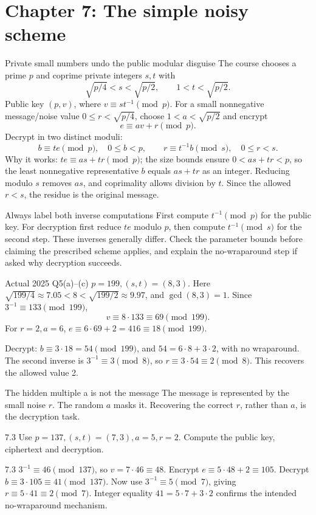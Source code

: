 \documentclass[11pt,a4paper]{article}
\begin{document}
\section{Chapter 7: The simple noisy scheme}
\begin{concept}{Private small numbers undo the public modular disguise}
The course chooses a prime \(p\) and coprime private integers \(s,t\) with
\[\sqrt{p/4}<s<\sqrt{p/2},\qquad1<t<\sqrt{p/2}.\]
Public key \((p,v)\), where \(v\equiv st^{-1}\pmod p\). For a small nonnegative message/noise value \(0\le r<\sqrt{p/4}\), choose \(1<a<\sqrt{p/2}\) and encrypt
\[e\equiv av+r\pmod p.\]
Decrypt in two distinct moduli:
\[b\equiv te\pmod p,\quad0\le b<p,\qquad r\equiv t^{-1}b\pmod s,\quad0\le r<s.\]
Why it works: \(te\equiv as+tr\pmod p\); the size bounds ensure \(0<as+tr<p\), so the least nonnegative representative \(b\) equals \(as+tr\) as an integer. Reducing modulo \(s\) removes \(as\), and coprimality allows division by \(t\). Since the allowed \(r<s\), the residue is the original message.
\end{concept}
\begin{method}{Always label both inverse computations}
First compute \(t^{-1}\pmod p\) for the public key. For decryption first reduce \(te\) modulo \(p\), then compute \(t^{-1}\pmod s\) for the second step. These inverses generally differ. Check the parameter bounds before claiming the prescribed scheme applies, and explain the no-wraparound step if asked why decryption succeeds.
\end{method}
\begin{example}{Actual 2025 Q5(a)--(c)}
\(p=199,(s,t)=(8,3)\). Here \(\sqrt{199/4}\approx7.05<8<\sqrt{199/2}\approx9.97\), and \(\gcd(8,3)=1\). Since \(3^{-1}\equiv133\pmod{199}\),
\[v\equiv8\cdot133\equiv69\pmod{199}.\]
For \(r=2,a=6\), \(e\equiv6\cdot69+2=416\equiv18\pmod{199}\).

Decrypt: \(b\equiv3\cdot18=54\pmod{199}\), and \(54=6\cdot8+3\cdot2\), with no wraparound. The second inverse is \(3^{-1}\equiv3\pmod8\), so \(r\equiv3\cdot54\equiv2\pmod8\). This recovers the allowed value 2.
\end{example}
\begin{tip}{The hidden multiple a is not the message}
The message is represented by the small noise \(r\). The random \(a\) masks it. Recovering the correct \(r\), rather than \(a\), is the decryption task.
\end{tip}
\begin{question}{7.3}
Use \(p=137,(s,t)=(7,3),a=5,r=2\). Compute the public key, ciphertext and decryption.
\end{question}
\begin{answer}{7.3}
\(3^{-1}\equiv46\pmod{137}\), so \(v=7\cdot46\equiv48\). Encrypt \(e\equiv5\cdot48+2\equiv105\). Decrypt \(b\equiv3\cdot105\equiv41\pmod{137}\). Now use \(3^{-1}\equiv5\pmod7\), giving \(r\equiv5\cdot41\equiv2\pmod7\). Integer equality \(41=5\cdot7+3\cdot2\) confirms the intended no-wraparound mechanism.
\end{answer}
\end{document}

